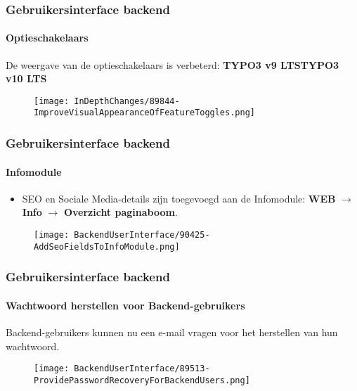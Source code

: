 
\begin{frame}[fragile]
	\frametitle{Gebruikersinterface backend}
	\framesubtitle{Optieschakelaars}

	De weergave van de optieschakelaars is verbeterd:
	\newline\newline
	\smaller\textbf{TYPO3 v9 LTS}\tabto{6cm}\textbf{TYPO3 v10 LTS}\normalsize

	\begin{figure}
		\texttt{[image: InDepthChanges/89844-ImproveVisualAppearanceOfFeatureToggles.png]}
	\end{figure}

\end{frame}


\begin{frame}[fragile]
	\frametitle{Gebruikersinterface backend}
	\framesubtitle{Infomodule}

	\begin{itemize}
		\item SEO en Sociale Media-details zijn toegevoegd aan de Infomodule:\newline
		\textbf{WEB} $\rightarrow$ \textbf{Info} $\rightarrow$ \textbf{Overzicht paginaboom}.
	\end{itemize}

	\begin{figure}
		\texttt{[image: BackendUserInterface/90425-AddSeoFieldsToInfoModule.png]}
	\end{figure}

\end{frame}


\begin{frame}[fragile]
	\frametitle{Gebruikersinterface backend}
	\framesubtitle{Wachtwoord herstellen voor Backend-gebruikers}

	Backend-gebruikers kunnen nu een e-mail vragen voor het herstellen van hun wachtwoord.

	\begin{figure}
		\texttt{[image: BackendUserInterface/89513-ProvidePasswordRecoveryForBackendUsers.png]}
	\end{figure}

\end{frame}

